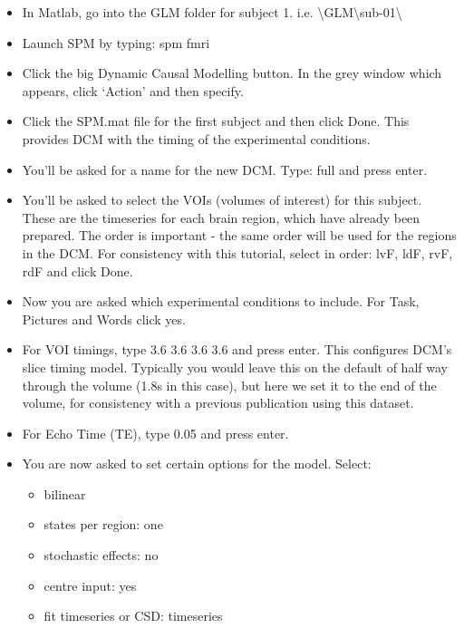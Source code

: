 \documentclass{article}
\begin{document}
\begin{itemize}
    
\item In Matlab, go into the GLM folder for subject 1. i.e. \textbackslash{GLM}\textbackslash{sub-01}\textbackslash

\item Launch SPM by typing: spm fmri

\item Click the big Dynamic Causal Modelling button. In the grey window which appears, click `Action' and then specify.

\item Click the SPM.mat file for the first subject and then click Done. This provides DCM with the timing of the experimental conditions.

\item You'll be asked for a name for the new DCM. Type: full  and press enter.

\item You'll be asked to select the VOIs (volumes of interest) for this subject. These are the timeseries for each brain region, which have already been prepared. The order is important - the same order will be used for the regions in the DCM. For consistency with this tutorial, select in order: lvF, ldF, rvF, rdF and click Done.

\item Now you are asked which experimental conditions to include. For Task, Pictures and Words click yes.

\item For VOI timings, type 3.6  3.6  3.6  3.6 and press enter. This configures DCM's slice timing model. Typically you would leave this on the default of half way through the volume (1.8s in this case), but here we set it to the end of the volume, for consistency with a previous publication using this dataset.

\item For Echo Time (TE), type 0.05 and press enter.

\item You are now asked to set certain options for the model. Select: 

\begin{itemize}
    \item bilinear
    \item states per region: one
    \item stochastic effects: no
    \item centre input: yes
    \item fit timeseries or CSD: timeseries
\end{itemize}


\end{itemize}
\end{document}
